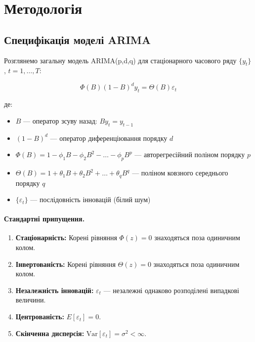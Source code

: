 
\section{Методологія}
\label{sec:methodology}

\subsection{Специфікація моделі ARIMA}
\label{subsec:arima_specification}

Розглянемо загальну модель ARIMA(p,d,q) для стаціонарного часового ряду $\{y_t\}$, $t=1,\ldots,T$:

\begin{equation}
\label{eq:arima_general}
\Phi(B)(1-B)^d y_t = \Theta(B) \varepsilon_t
\end{equation}

\noindent де:
\begin{itemize}
    \item $B$ --- оператор зсуву назад: $By_t = y_{t-1}$
    \item $(1-B)^d$ --- оператор диференціювання порядку $d$
    \item $\Phi(B) = 1 - \phi_1 B - \phi_2 B^2 - \ldots - \phi_p B^p$ --- авторегресійний поліном порядку $p$
    \item $\Theta(B) = 1 + \theta_1 B + \theta_2 B^2 + \ldots + \theta_q B^q$ --- поліном ковзного середнього порядку $q$
    \item $\{\varepsilon_t\}$ --- послідовність інновацій (білий шум)
\end{itemize}

\paragraph{Стандартні припущення.}

\begin{enumerate}
    \item \textbf{Стаціонарність:} Корені рівняння $\Phi(z)=0$ знаходяться поза одиничним колом.
    \item \textbf{Інвертованість:} Корені рівняння $\Theta(z)=0$ знаходяться поза одиничним колом.
    \item \textbf{Незалежність інновацій:} $\varepsilon_t$ --- незалежні однаково розподілені випадкові величини.
    \item \textbf{Центрованість:} $E[\varepsilon_t] = 0$.
    \item \textbf{Скінченна дисперсія:} $\text{Var}[\varepsilon_t] = \sigma^2 < \infty$.
\end{enumerate}

